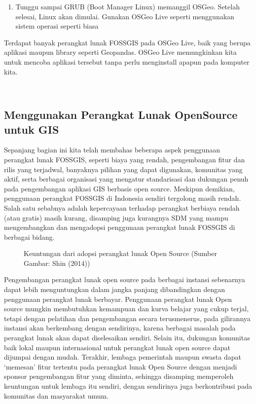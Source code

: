 \documentclass[letterpaper,10pt,english]{sphinxmanual}
\let\sphinxpxdimen\pdfpxdimen\else\newdimen\sphinxpxdimen
\begin{document}
\begin{enumerate}

\item {} 
Tunggu sampai GRUB (Boot Manager Linux) memanggil OSGeo. Setelah selesai, Linux akan dimulai. Gunakan OSGeo Live seperti menggunakan sistem operasi seperti biasa

\end{enumerate}

Terdapat banyak perangkat lunak FOSS\sphinxhyphen{}GIS pada OSGeo Live, baik yang berupa aplikasi maupun library seperti Geopandas. OSGeo Live memungkinkan kita untuk mencoba aplikasi tersebut tanpa perlu menginstall apapun pada komputer kita.

 


\subsection{Menggunakan Perangkat Lunak OpenSource untuk GIS}
\label{\detokenize{sesi1/fossgis:menggunakan-perangkat-lunak-opensource-untuk-gis}}
Sepanjang bagian ini kita telah membahas beberapa aspek penggunaan perangkat lunak FOSS\sphinxhyphen{}GIS, seperti biaya yang rendah, pengembangan fitur dan rilis yang terjadwal, banyaknya pilihan yang dapat digunakan, komunitas yang aktif, serta berbagai organisasi yang mengatur standarisasi dan dukungan penuh pada pengembangan aplikasi GIS berbasis open source. Meskipun demikian, penggunaan perangkat FOSS\sphinxhyphen{}GIS di Indonesia sendiri tergolong masih rendah. Salah satu sebabnya adalah kepercayaan terhadap perangkat berbiaya rendah (atau gratis) masih kurang, disamping juga kurangnya SDM yang mampu mengembangkan dan mengadopsi penggunaan perangkat lunak FOSS\sphinxhyphen{}GIS di berbagai bidang.

\begin{figure}[htbp]
\centering
\capstart

\noindent\sphinxincludegraphics[height=300\sphinxpxdimen]{{2020-12-07-13-09-54}.png}
\caption{Keuntungan dari adopsi perangkat lunak Open Source (Sumber Gambar: Shin (2014))}\label{\detokenize{sesi1/fossgis:adopsi}}\end{figure}

Pengembangan perangkat lunak open source pada berbagai instansi sebenarnya dapat lebih menguntungkan dalam jangka panjang dibandingkan dengan penggunaan perangkat lunak berbayar. Penggunaan perangkat lunak Open source mungkin membutuhkan kemampuan dan kurva belajar yang cukup terjal, tetapi dengan pelatihan dan pengembangan secara terus\sphinxhyphen{}menerus, pada gilirannya instansi akan berkembang dengan sendirinya, karena berbagai masalah pada perangkat lunak akan dapat diselesaikan sendiri. Selain itu, dukungan komunitas baik lokal maupun internasional untuk perangkat lunak open source dapat dijumpai dengan mudah. Terakhir, lembaga pemerintah maupun swasta dapat ‘memesan’ fitur tertentu pada perangkat lunak Open Source dengan menjadi sponsor pengembangan fitur yang diminta, sehingga disamping memperoleh keuntungan untuk lembaga itu sendiri, dengan sendirinya juga berkontribusi pada komunitas dan masyarakat umum.
\end{document}
